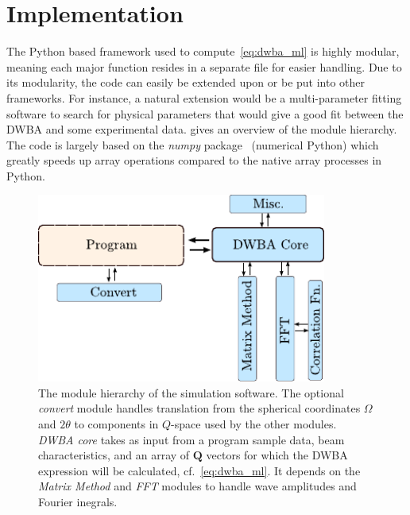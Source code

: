 \documentclass[10pt,twoside, b5paper,pdftex]{report}
\begin{document}
\section{Implementation}
The Python based framework used to compute~\cref{eq:dwba_ml} is highly modular, meaning each major function resides in a separate file for easier handling. Due to its modularity, the code can easily be extended upon or be put into other frameworks. For instance, a natural extension would be a multi-parameter fitting software to search for physical parameters that would give a good fit between the DWBA and some experimental data.  gives an overview of the module hierarchy. The code is largely based on the {\it numpy} package~\cite{NUMPY} (numerical Python) which greatly speeds up array operations compared to the native array processes in Python. 
\begin{figure}[htbp]
	\begin{center}
		\includegraphics[width=0.85\textwidth]{figures/hierarchy.pdf}		
	\end{center}
	\caption{The module hierarchy of the simulation software. The optional {\it convert} module handles translation from the spherical coordinates $\Omega$ and $2\theta$ to components in $Q$-space used by the other modules. {\it DWBA core} takes as input from a program sample data, beam characteristics, and an array of $\mathbf{Q}$ vectors for which the DWBA expression will be calculated, cf.~\cref{eq:dwba_ml}. It depends on the {\it Matrix Method} and {\it FFT} modules to handle wave amplitudes and Fourier inegrals.\label{fig:framework}}
\end{figure}
\end{document}
